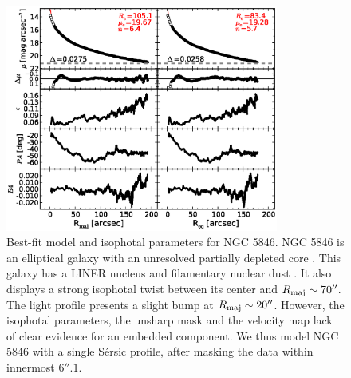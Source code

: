 \documentclass[preprint2]{emulateapj}
\newcommand{\fitfigurewidth}{0.8\textwidth}
\begin{document}
  \begin{figure}[h]
  \begin{center}
  \includegraphics[width=\fitfigurewidth]{images/n5846_1Dfit.eps}
  \caption{Best-fit model and isophotal parameters for NGC 5846.
  NGC 5846 is an elliptical galaxy with an unresolved partially depleted core \citep{rusli2013}. %
  This galaxy has a LINER nucleus \citep{carrillo1999} and filamentary nuclear dust \citep{tran2001}.
  It also displays a strong isophotal twist between its center and $R_{\rm maj} \sim 70''$.
  The light profile presents a slight bump at $R_{\rm maj} \sim 20''$.
  However, the isophotal parameters, the unsharp mask and the velocity map lack of clear evidence for an embedded component.
  We thus model NGC 5846 with a single S\'ersic profile, after masking the data within innermost $6''.1$.
  }
  \end{center}
  \end{figure}
\end{document}
